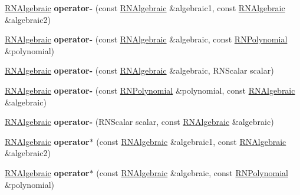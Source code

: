 \begin{DoxyCompactItemize}
\item 
\hyperlink{class_r_n_algebraic}{R\+N\+Algebraic} {\bfseries operator-\/} (const \hyperlink{class_r_n_algebraic}{R\+N\+Algebraic} \&algebraic1, const \hyperlink{class_r_n_algebraic}{R\+N\+Algebraic} \&algebraic2)\hypertarget{class_r_n_algebraic_ac2f290c981cb9105d6464e0454691c24}{}\label{class_r_n_algebraic_ac2f290c981cb9105d6464e0454691c24}

\item 
\hyperlink{class_r_n_algebraic}{R\+N\+Algebraic} {\bfseries operator-\/} (const \hyperlink{class_r_n_algebraic}{R\+N\+Algebraic} \&algebraic, const \hyperlink{class_r_n_polynomial}{R\+N\+Polynomial} \&polynomial)\hypertarget{class_r_n_algebraic_a18fa81897a6be0cfc9ac4f330c24873b}{}\label{class_r_n_algebraic_a18fa81897a6be0cfc9ac4f330c24873b}

\item 
\hyperlink{class_r_n_algebraic}{R\+N\+Algebraic} {\bfseries operator-\/} (const \hyperlink{class_r_n_algebraic}{R\+N\+Algebraic} \&algebraic, R\+N\+Scalar scalar)\hypertarget{class_r_n_algebraic_a7c213afab7480a1452a6754a05acf796}{}\label{class_r_n_algebraic_a7c213afab7480a1452a6754a05acf796}

\item 
\hyperlink{class_r_n_algebraic}{R\+N\+Algebraic} {\bfseries operator-\/} (const \hyperlink{class_r_n_polynomial}{R\+N\+Polynomial} \&polynomial, const \hyperlink{class_r_n_algebraic}{R\+N\+Algebraic} \&algebraic)\hypertarget{class_r_n_algebraic_afaea02b7dd6fe7658cfab7ce9c196eb2}{}\label{class_r_n_algebraic_afaea02b7dd6fe7658cfab7ce9c196eb2}

\item 
\hyperlink{class_r_n_algebraic}{R\+N\+Algebraic} {\bfseries operator-\/} (R\+N\+Scalar scalar, const \hyperlink{class_r_n_algebraic}{R\+N\+Algebraic} \&algebraic)\hypertarget{class_r_n_algebraic_a630c05e0f9c476caa9ebf6049fa99b58}{}\label{class_r_n_algebraic_a630c05e0f9c476caa9ebf6049fa99b58}

\item 
\hyperlink{class_r_n_algebraic}{R\+N\+Algebraic} {\bfseries operator$\ast$} (const \hyperlink{class_r_n_algebraic}{R\+N\+Algebraic} \&algebraic1, const \hyperlink{class_r_n_algebraic}{R\+N\+Algebraic} \&algebraic2)\hypertarget{class_r_n_algebraic_a1d139926e29009cea0921f34dfed7ebd}{}\label{class_r_n_algebraic_a1d139926e29009cea0921f34dfed7ebd}

\item 
\hyperlink{class_r_n_algebraic}{R\+N\+Algebraic} {\bfseries operator$\ast$} (const \hyperlink{class_r_n_algebraic}{R\+N\+Algebraic} \&algebraic, const \hyperlink{class_r_n_polynomial}{R\+N\+Polynomial} \&polynomial)\hypertarget{class_r_n_algebraic_a125c19dbceefaee78bdfb0d0bcb4697d}{}\label{class_r_n_algebraic_a125c19dbceefaee78bdfb0d0bcb4697d}


\end{DoxyCompactItemize}
